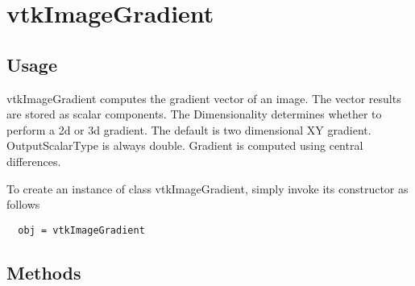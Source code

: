 \section{vtkImageGradient}

\subsection{Usage}

 vtkImageGradient computes the gradient vector of an image.  The
 vector results are stored as scalar components. The Dimensionality
 determines whether to perform a 2d or 3d gradient. The default is
 two dimensional XY gradient.  OutputScalarType is always
 double. Gradient is computed using central differences.

To create an instance of class vtkImageGradient, simply
invoke its constructor as follows
\begin{verbatim}
  obj = vtkImageGradient
\end{verbatim}
\subsection{Methods}

